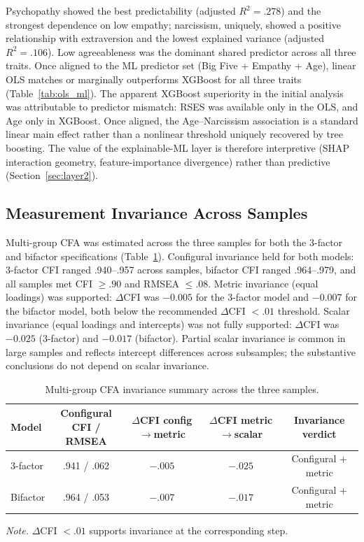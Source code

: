 \documentclass[11pt,twocolumn]{article}
\begin{document}
Psychopathy showed the best predictability (adjusted $R^2 = .278$) and the strongest dependence on low empathy; narcissism, uniquely, showed a positive relationship with extraversion and the lowest explained variance (adjusted $R^2 = .106$). Low agreeableness was the dominant shared predictor across all three traits. Once aligned to the ML predictor set (Big Five + Empathy + Age), linear OLS matches or marginally outperforms XGBoost for all three traits (Table~\ref{tab:ols_ml}). The apparent XGBoost superiority in the initial analysis was attributable to predictor mismatch: RSES was available only in the OLS, and Age only in XGBoost. Once aligned, the Age--Narcissism association is a standard linear main effect rather than a nonlinear threshold uniquely recovered by tree boosting. The value of the explainable-ML layer is therefore interpretive (SHAP interaction geometry, feature-importance divergence) rather than predictive (Section~\ref{sec:layer2}).

\subsection{Measurement Invariance Across Samples}

Multi-group CFA was estimated across the three samples for both the 3-factor and bifactor specifications (Table~\ref{tab:invariance}). Configural invariance held for both models: 3-factor CFI ranged .940--.957 across samples, bifactor CFI ranged .964--.979, and all samples met CFI $\geq .90$ and RMSEA $\leq .08$. Metric invariance (equal loadings) was supported: $\Delta$CFI was $-0.005$ for the 3-factor model and $-0.007$ for the bifactor model, both below the recommended $\Delta$CFI $< .01$ threshold. Scalar invariance (equal loadings and intercepts) was not fully supported: $\Delta$CFI was $-0.025$ (3-factor) and $-0.017$ (bifactor). Partial scalar invariance is common in large samples and reflects intercept differences across subsamples; the substantive conclusions do not depend on scalar invariance.

\begin{table}[!t]
\centering
\caption{Multi-group CFA invariance summary across the three samples.}
\label{tab:invariance}
\footnotesize
\begin{tabular}{lcccc}
\toprule
Model & \makecell{Configural\\CFI / RMSEA} & \makecell{$\Delta$CFI\\config$\to$metric} & \makecell{$\Delta$CFI\\metric$\to$scalar} & \makecell{Invariance\\verdict} \\
\midrule
3-factor & .941 / .062 & $-.005$ & $-.025$ & Configural + metric \\
Bifactor & .964 / .053 & $-.007$ & $-.017$ & Configural + metric \\
\bottomrule
\end{tabular}
\par\smallskip
\footnotesize\raggedright
\textit{Note.} $\Delta$CFI $< .01$ supports invariance at the corresponding step.
\end{table}
\end{document}
